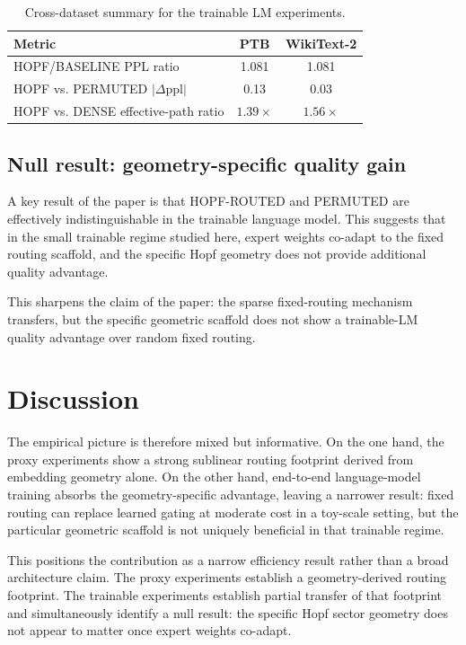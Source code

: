 \documentclass[10pt,twocolumn]{article}
\begin{document}
\begin{table}[t]
\centering
\caption{Cross-dataset summary for the trainable LM experiments.}
\label{tab:crossdataset}
\small
\begin{tabular}{lcc}
\toprule
Metric & PTB & WikiText-2 \\
\midrule
HOPF/BASELINE PPL ratio & 1.081 & 1.081 \\
HOPF vs. PERMUTED $|\Delta \mathrm{ppl}|$ & 0.13 & 0.03 \\
HOPF vs. DENSE effective-path ratio & $1.39\times$ & $1.56\times$ \\
\bottomrule
\end{tabular}
\end{table}

\subsection{Null result: geometry-specific quality gain}
A key result of the paper is that HOPF-ROUTED and PERMUTED are effectively indistinguishable in the trainable language model. This suggests that in the small trainable regime studied here, expert weights co-adapt to the fixed routing scaffold, and the specific Hopf geometry does not provide additional quality advantage.

This sharpens the claim of the paper: the sparse fixed-routing mechanism transfers, but the specific geometric scaffold does not show a trainable-LM quality advantage over random fixed routing.

\section{Discussion}
The empirical picture is therefore mixed but informative. On the one hand, the proxy experiments show a strong sublinear routing footprint derived from embedding geometry alone. On the other hand, end-to-end language-model training absorbs the geometry-specific advantage, leaving a narrower result: fixed routing can replace learned gating at moderate cost in a toy-scale setting, but the particular geometric scaffold is not uniquely beneficial in that trainable regime.

This positions the contribution as a narrow efficiency result rather than a broad architecture claim. The proxy experiments establish a geometry-derived routing footprint. The trainable experiments establish partial transfer of that footprint and simultaneously identify a null result: the specific Hopf sector geometry does not appear to matter once expert weights co-adapt.
\end{document}
